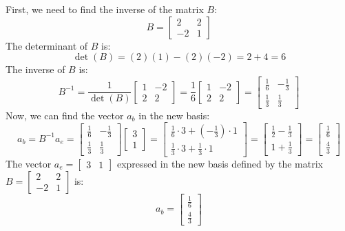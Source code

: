\documentclass{article}
\begin{document}
\noindent
First, we need to find the inverse of the matrix $B$:
\[
B = \begin{bmatrix}2 & 2 \\ -2 & 1\end{bmatrix}
\]
The determinant of $B$ is:
\[
\det(B) = (2)(1) - (2)(-2) = 2 + 4 = 6
\]
The inverse of $B$ is:
\[
B^{-1} = \frac{1}{\det(B)} \begin{bmatrix}1 & -2 \\ 2 & 2\end{bmatrix} = \frac{1}{6} \begin{bmatrix}1 & -2 \\ 2 & 2\end{bmatrix} = \begin{bmatrix}\frac{1}{6} & -\frac{1}{3} \\ \frac{1}{3} & \frac{1}{3}\end{bmatrix}
\]
\noindent
Now, we can find the vector $a_b$ in the new basis:
\[
a_b = B^{-1} a_e = \begin{bmatrix}\frac{1}{6} & -\frac{1}{3} \\ \frac{1}{3} & \frac{1}{3}\end{bmatrix} \begin{bmatrix}3 \\ 1\end{bmatrix} = \begin{bmatrix}\frac{1}{6} \cdot 3 + (-\frac{1}{3}) \cdot 1 \\ \frac{1}{3} \cdot 3 + \frac{1}{3} \cdot 1\end{bmatrix} = \begin{bmatrix}\frac{1}{2} - \frac{1}{3} \\ 1 + \frac{1}{3}\end{bmatrix} = \begin{bmatrix}\frac{1}{6} \\ \frac{4}{3}\end{bmatrix}
\]
\noindent
The vector $a_e = \begin{bmatrix}3 & 1\end{bmatrix}$ expressed in the new basis defined by the matrix $B = \begin{bmatrix}2 & 2 \\ -2 & 1\end{bmatrix}$ is:
\[
a_b = \begin{bmatrix}\frac{1}{6} \\ \frac{4}{3}\end{bmatrix}
\]

%
\vfill\break
\end{document}
